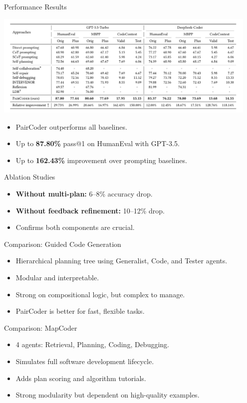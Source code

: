 \documentclass{beamer}
\begin{document}
\begin{frame}{Performance Results}
\begin{center}
    \includegraphics[width=0.95\textwidth]{paircoder-results.png}
\end{center}
\begin{itemize}
    \item PairCoder outperforms all baselines.
    \item Up to \textbf{87.80\%} pass@1 on HumanEval with GPT-3.5.
    \item Up to \textbf{162.43\%} improvement over prompting baselines.
\end{itemize}
\end{frame}

\begin{frame}{Ablation Studies}
\begin{itemize}
    \item \textbf{Without multi-plan:} 6--8\% accuracy drop.
    \item \textbf{Without feedback refinement:} 10--12\% drop.
    \item Confirms both components are crucial.
\end{itemize}
\end{frame}

\begin{frame}{Comparison: Guided Code Generation}
\begin{itemize}
    \item Hierarchical planning tree using Generalist, Code, and Tester agents.
    \item Modular and interpretable.
    \item Strong on compositional logic, but complex to manage.
    \item PairCoder is better for fast, flexible tasks.
\end{itemize}
\end{frame}

\begin{frame}{Comparison: MapCoder}
\begin{itemize}
    \item 4 agents: Retrieval, Planning, Coding, Debugging.
    \item Simulates full software development lifecycle.
    \item Adds plan scoring and algorithm tutorials.
    \item Strong modularity but dependent on high-quality examples.
\end{itemize}
\end{frame}
\end{document}
